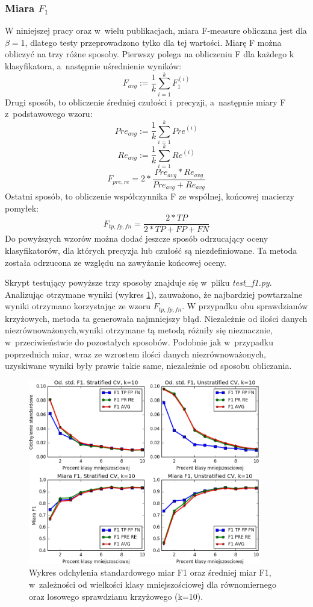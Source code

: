 \subsubsection{Miara $F_1$}
W niniejszej pracy oraz w~wielu publikacjach, miara F-measure obliczana jest dla $\beta=1$, dlatego testy przeprowadzono tylko dla tej wartości. Miarę F można obliczyć na trzy różne sposoby. Pierwszy polega na obliczeniu F dla każdego k klasyfikatora, a~następnie uśrednienie wyników:
\[F_{avg} := \frac{1}{k} \sum_{i=1}^{k} F_1^{(i)}\]
Drugi sposób, to obliczenie średniej czułości i~precyzji, a~następnie miary F z~podstawowego wzoru:
\[Pre_{avg} := \frac{1}{k} \sum_{i=1}^{k} Pre^{(i)}\]
\[Re_{avg} := \frac{1}{k} \sum_{i=1}^{k} Re^{(i)}\]
\[F_{pre, re} = 2 * \frac{Pre_{avg}*Re_{avg}}{Pre_{avg}+Re_{avg}} \]
Ostatni sposób, to obliczenie współczynnika F ze wspólnej, końcowej macierzy pomyłek:
\[F_{tp, fp, fn} = \frac{2*TP}{2*TP+FP+FN} \]
Do powyższych wzorów można dodać jeszcze sposób odrzucający oceny klasyfikatorów, dla których precyzja lub czułość są niezdefiniowane. Ta metoda została odrzucona ze względu na zawyżanie końcowej oceny. \par 
Skrypt testujący powyższe trzy sposoby znajduje się w~pliku \textit{test\_f1.py}. Analizując otrzymane wyniki (wykres \ref{fig:wykresf1}), zauważono, że najbardziej powtarzalne wyniki otrzymano korzystając ze wzoru $F_{tp, fp, fn}$. W przypadku obu sprawdzianów krzyżowych, metoda ta generowała najmniejszy błąd. Niezależnie od ilości danych niezrównoważonych,wyniki otrzymane tą metodą różniły się nieznacznie, w~przeciwieństwie do pozostałych sposobów. Podobnie jak w~przypadku poprzednich miar, wraz ze wzrostem ilości danych niezrównoważonych, uzyskiwane wyniki były prawie takie same, niezależnie od sposobu obliczania.
\begin{figure}[H]
	\centering
	\includegraphics[width=0.9\textwidth]{./images/miara-F1.png}
	\caption[Odchylenie standardowe oraz średnia miar F1 dla sprawdzianu krzyżowego]{Wykres odchylenia standardowego miar F1 oraz średniej miar F1, w~zależności od wielkości klasy mniejszościowej dla równomiernego oraz losowego sprawdzianu krzyżowego (k=10).}
	\label{fig:wykresf1}
\end{figure}
